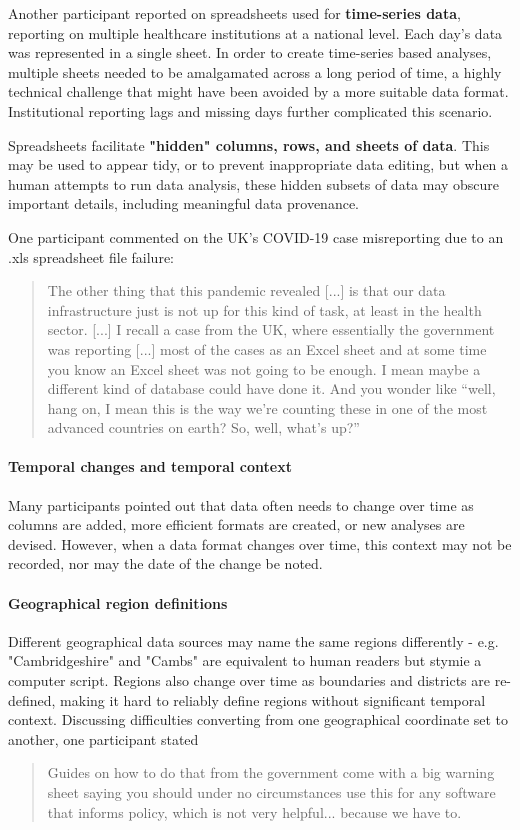 \documentclass{CUP-JNL-DAP}%
\begin{document}
Another participant reported on spreadsheets used for \textbf{time-series data}, reporting on multiple healthcare institutions at a national level. Each day's data was represented in a single sheet. In order to create time-series based analyses, multiple sheets needed to be amalgamated across a long period of time, a highly technical challenge that might have been avoided by a more suitable data format. Institutional reporting lags and missing days further complicated this scenario. 

Spreadsheets facilitate \textbf{"hidden" columns, rows, and sheets of data}. This may be used to appear tidy, or to prevent inappropriate data editing, but when a human attempts to run data analysis, these hidden subsets of data may obscure important details, including meaningful data provenance.

One participant commented on the UK's COVID-19 case misreporting due to an .xls spreadsheet file failure: 
\blockquote{The other thing that this pandemic revealed [...] is that our data infrastructure just is not up for this kind of task, at least in the health sector. [...] I recall a case from the UK, where essentially the government was reporting [...] most of the cases as an Excel sheet and at some time you know an Excel sheet was not going to be enough. I mean maybe a different kind of database could have done it. And you wonder like \enquote{well, hang on, I mean this is the way we're counting these in one of the most advanced countries on earth? So, well, what's up?}}

\paragraph{Temporal changes and temporal context}
Many participants pointed out that data often needs to change over time as columns are added, more efficient formats are created, or new analyses are devised. However, when a data format changes over time, this context may not be recorded, nor may the date of the change be noted. 

\paragraph{Geographical region definitions} 
Different geographical data sources may name the same regions differently - e.g. "Cambridgeshire" and "Cambs" are equivalent to human readers but stymie a computer script. Regions also change over time as boundaries and districts are re-defined, making it hard to reliably define regions without significant temporal context. Discussing difficulties converting from one geographical coordinate set to another, one participant stated 
\blockquote{Guides on how to do that from the government come with a big warning sheet saying you should under no circumstances use this for any software that informs policy, which is not very helpful... because we have to.}
\end{document}
